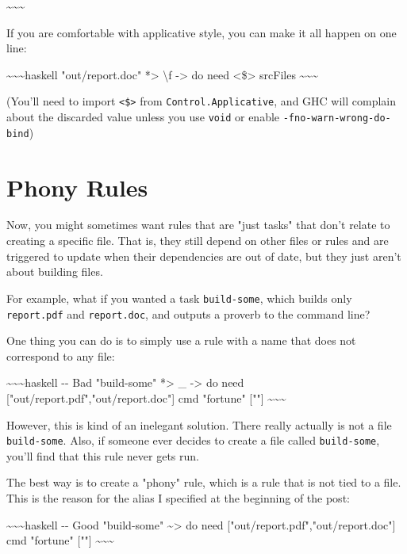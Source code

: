 \documentclass[]{article}
\begin{document}
\textasciitilde{}\textasciitilde{}\textasciitilde{}

If you are comfortable with applicative style, you can make it all happen on one
line:

\textasciitilde{}\textasciitilde{}\textasciitilde{}haskell "out/report.doc"
*\textgreater{} \textbackslash{}f -\textgreater{} do need
\textless{}\$\textgreater{} srcFiles
\textasciitilde{}\textasciitilde{}\textasciitilde{}

(You'll need to import \texttt{\textless{}\$\textgreater{}} from
\texttt{Control.Applicative}, and GHC will complain about the discarded value
unless you use \texttt{void} or enable \texttt{-fno-warn-wrong-do-bind})

\section{Phony Rules}

Now, you might sometimes want rules that are "just tasks" that don't relate to
creating a specific file. That is, they still depend on other files or rules and
are triggered to update when their dependencies are out of date, but they just
aren't about building files.

For example, what if you wanted a task \texttt{build-some}, which builds only
\texttt{report.pdf} and \texttt{report.doc}, and outputs a proverb to the
command line?

One thing you can do is to simply use a rule with a name that does not
correspond to any file:

\textasciitilde{}\textasciitilde{}\textasciitilde{}haskell -\/- Bad "build-some"
*\textgreater{} \_ -\textgreater{} do need
{[}"out/report.pdf","out/report.doc"{]} cmd "fortune" {[}""{]}
\textasciitilde{}\textasciitilde{}\textasciitilde{}

However, this is kind of an inelegant solution. There really actually is not a
file \texttt{build-some}. Also, if someone ever decides to create a file called
\texttt{build-some}, you'll find that this rule never gets run.

The best way is to create a "phony" rule, which is a rule that is not tied to a
file. This is the reason for the alias I specified at the beginning of the post:

\textasciitilde{}\textasciitilde{}\textasciitilde{}haskell -\/- Good
"build-some" \textasciitilde{}\textgreater{} do need
{[}"out/report.pdf","out/report.doc"{]} cmd "fortune" {[}""{]}
\textasciitilde{}\textasciitilde{}\textasciitilde{}
\end{document}
